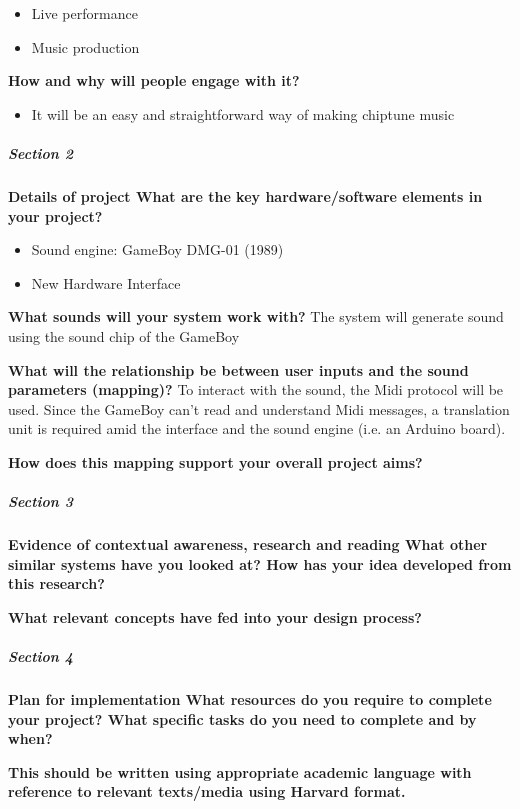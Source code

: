 \documentclass[]{article}
\begin{document}
        \begin{itemize}
        \item Live performance
        \item Music production
        \end{itemize}

    \textbf{How and why will people engage with it?}

        \begin{itemize}
        \item It will be an easy and straightforward way of making chiptune music
        \end{itemize}

\subparagraph[]{Section 2}

    \textbf{Details of project What are the key hardware/software elements in your
    project?}

        \begin{itemize}
            \item Sound engine: GameBoy DMG-01 (1989)
            \item New Hardware Interface
        \end{itemize}

    \textbf{What sounds will your system work with?}
    The system will generate sound using the sound chip of the GameBoy

    \textbf{What will the relationship be between user inputs and the sound 
    parameters (mapping)?} 
    To interact with the sound, the Midi protocol will be used.
    Since the GameBoy can't read and understand Midi messages,
    a translation unit is required amid the interface and the sound engine (i.e. an Arduino board).

    \textbf{How does this mapping support your overall project aims?}

\subparagraph[]{Section 3}

    \textbf{Evidence of contextual awareness, research and reading What other similar
    systems have you looked at? How has your idea developed from this research? }
    
    \textbf{What relevant concepts have fed into your design process?}

\subparagraph[]{Section 4}
    
    \textbf{Plan for implementation What resources do you require to complete your
    project? What specific tasks do you need to complete and by when?}

    \textbf{This should be written using appropriate academic language with reference
    to relevant texts/media using Harvard format.}



\end{document}
